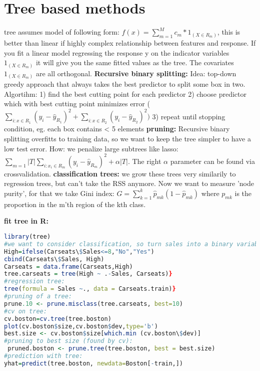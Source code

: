 \section{Tree based methods}
tree assumes model of following form: 
$f(x) = \sum_{m=1}^M c_m*1_{(X \in R_m)}$, this is better than linear if highly complex relationship between features and response. If you fit a linear model regressing the response y on the indicator variables $1_{(X \in R_m)}$ it will give you the same fitted values as the tree. The covariates $1_{(X \in R_m)}$ are all orthogonal.
\textbf{Recursive binary splitting: }
Idea: top-down greedy approach that always takes the best predictor to split some box in two. Algortihm:
1) find the best cutting point for each predictor
2) choose predictor which with best cutting point minimizes error ($\sum_{i:x \in R_1}(y_i-\hat y_{R_1})^2+\sum_{i:x \in R_2}(y_i-\hat y_{R_2})^2)$
3) repeat until stopping condition, eg. each box contains < 5 elements
\textbf{pruning: } Recursive binary splitting overfitts to training data, so we want to keep the tree simpler to have a low test error. How: we penalize large subtrees like lasso: $\sum_{m=1}{|T|}\sum_{i: x_i \in R_m}(y_i - \hat y_{R_m})^2 + \alpha|T|$. The right $\alpha$ parameter can be found via crossvalidation. 
\textbf{classification trees: } we grow these trees very similarily to regression trees, but can't take the RSS anymore. Now we want to measure 'node purity', for that we take Gini index: $G = \sum_{k=1}^k \hat p_{mk}(1-\hat p_{mk})$ where $p_{mk}$ is the proportion in the m'th region of the kth class.

\textbf{fit tree in R:}\begin{lstlisting}[language=R] library(tree)
#we want to consider classification, so turn sales into a binary variable
High=ifelse(Carseats\$Sales<=8,"No","Yes")
cbind(Carseats\$Sales, High)
Carseats = data.frame(Carseats,High)
tree.carseats = tree(High ~ .-Sales, Carseats)}
#regression tree: 
tree(formula = Sales ~., data = Carseats.train)} 
#pruning of a tree:
prune.10 <- prune.misclass(tree.carseats, best=10)
#cv on tree: 
cv.boston=cv.tree(tree.boston)
plot(cv.boston$size,cv.boston$dev,type='b')
best.size <- cv.boston$size[which.min (cv.boston\$dev)]
#pruning to best size (found by cv): 
 pruned.boston <- prune.tree(tree.boston, best = best.size)
#prediction with tree: 
yhat=predict(tree.boston, newdata=Boston[-train,])  \end{lstlisting}